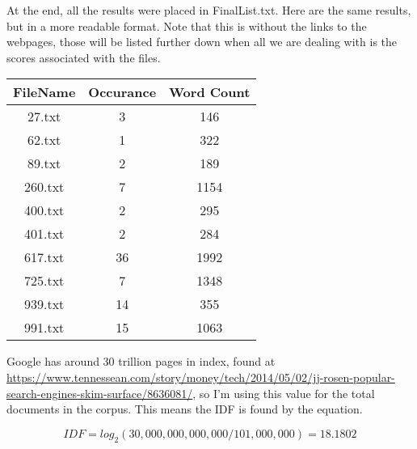 \documentclass[11pt]{report}
\begin{document}
At the end, all the results were placed in FinalList.txt. Here are the same results, but in a more readable format. Note that this is without the links to the webpages, those will be listed further down when all we are dealing with is the scores associated with the files.
\begin{center}

\begin{tabular}{ |c|c|c| } 
 \hline
FileName & Occurance & Word Count\\\hline 
27.txt & 3 & 146\\\hline 
62.txt & 1 & 322\\\hline 
89.txt & 2 & 189\\\hline 
260.txt & 7 & 1154 \\\hline 
400.txt & 2 & 295 \\\hline  
401.txt & 2 & 284 \\ \hline 
617.txt & 36 & 1992\\\hline 
725.txt & 7 & 1348 \\\hline  
939.txt & 14 & 355 \\\hline 
991.txt & 15 & 1063\\\hline 
\end{tabular}
\pagebreak

Google has around 30 trillion pages in index, found at \url{https://www.tennessean.com/story/money/tech/2014/05/02/jj-rosen-popular-search-engines-skim-surface/8636081/}, so I'm using this value for the total documents in the corpus. This means the IDF is found by the equation.

\begin{equation}
IDF = log_2(30,000,000,000,000 / 101,000,000) =18.1802
\end{equation}


\end{center}
\end{document}
